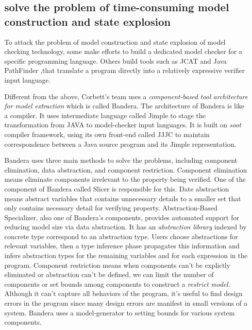 \documentclass[acmsmall]{acmart}
\begin{document}
\subsection{solve the problem of time-consuming model construction and state explosion}
To attack the problem of model construction and state explosion of model checking technology, some make efforts to build a dedicated model checker for a specific programming language\cite{huch1999verification}. Others build tools such as JCAT \cite{demartini1999deadlock} 
and Java PathFinder \cite{havelund2000model},that translate a program directly into a relatively expressive verifier input language. 


Different from the above, Corbett's team uses a {\itshape component-based tool architecture for model extraction} which is called Bandera. The architecture of Bandera is like a compiler. It uses intermediate language called Jimple to stage the transformation from JAVA to model-checker input languages. It is built on {\itshape soot} compiler framework, using its own front-end called JJJC to maintain correspondence between a Java source program and its Jimple representation. 


Bandera uses three main methods to solve the problems, including component elimination, data abstraction, and component restriction. Component elimination means eliminate components irrelevant to the property being verified. One of the component of Bandera called Slicer is responsible for this. Date abstraction means abstract variables that contains unnecessary details to a smaller set that only contains necessary detail for verifying property. Abstraction-Based Specializer, also one of Bandera's components, provides automated support for reducing model size via data abstraction. It has an {\itshape abstraction library} indexed by concrete type correspond to an abstraction type. Users choose abstractions for relevant variables, then a type inference phase propagates this information and infers abstraction types for the remaining variables and for each expression in the program. Component restriction means when components can't be explictly eliminated or abstraction can't be defined, we can limit the number of components or set bounds among components to construct a {\itshape restrict model}. Although it can't capture all behaviors of the program, it's useful to find design errors in the program since many design errors are manifest in small versions of a system. Bandera uses a model-generator to setting bounds for various system components.
\end{document}
